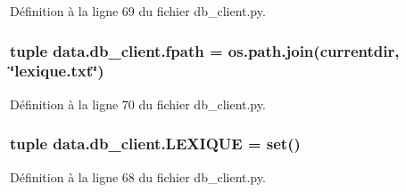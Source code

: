 Définition à la ligne 69 du fichier db\+\_\+client.\+py.

\hypertarget{namespacedata_1_1db__client_a0bc1de8f09afba462321b07612578a10}{}
\subsubsection[{fpath}]{\setlength{\rightskip}{0pt plus 5cm}tuple data.\+db\+\_\+client.\+fpath = os.\+path.\+join({\bf currentdir}, \char`\"{}lexique.\+txt\char`\"{})}\label{namespacedata_1_1db__client_a0bc1de8f09afba462321b07612578a10}


Définition à la ligne 70 du fichier db\+\_\+client.\+py.

\hypertarget{namespacedata_1_1db__client_ac9dbcfd3eaa0b02a22dcb2174970560b}{}
\subsubsection[{L\+E\+X\+I\+Q\+U\+E}]{\setlength{\rightskip}{0pt plus 5cm}tuple data.\+db\+\_\+client.\+L\+E\+X\+I\+Q\+U\+E = set()}\label{namespacedata_1_1db__client_ac9dbcfd3eaa0b02a22dcb2174970560b}


Définition à la ligne 68 du fichier db\+\_\+client.\+py.

